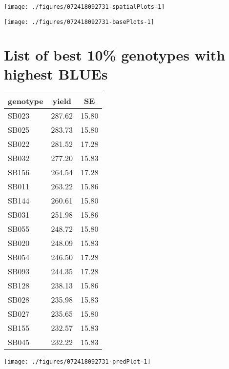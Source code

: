 \documentclass[a4paper,11pt]{article}\usepackage[]{graphicx}\usepackage[]{color}
\newenvironment{knitrout}{}{} %
\begin{document}
\texttt{[image: ./figures/072418092731-spatialPlots-1]} 

\begin{knitrout}
\color{fgcolor}
\texttt{[image: ./figures/072418092731-basePlots-1]} 

\end{knitrout}
\newpage

\section{List of best 10\% genotypes with
highest BLUEs}

\begin{multicols*}{2}
\begin{tabular}{lcc}
  \hline
genotype & yield & SE \\ 
  \hline
SB023 & 287.62 & 15.80 \\ 
  SB025 & 283.73 & 15.80 \\ 
  SB022 & 281.52 & 17.28 \\ 
  SB032 & 277.20 & 15.83 \\ 
  SB156 & 264.54 & 17.28 \\ 
  SB011 & 263.22 & 15.86 \\ 
  SB144 & 260.61 & 15.80 \\ 
  SB031 & 251.98 & 15.86 \\ 
  SB055 & 248.72 & 15.80 \\ 
  SB020 & 248.09 & 15.83 \\ 
  SB054 & 246.50 & 17.28 \\ 
  SB093 & 244.35 & 17.28 \\ 
  SB128 & 238.13 & 15.86 \\ 
  SB028 & 235.98 & 15.83 \\ 
  SB027 & 235.65 & 15.80 \\ 
  SB155 & 232.57 & 15.83 \\ 
  SB045 & 232.22 & 15.83 \\ 
   \hline
\end{tabular}

\columnbreak
\begin{knitrout}
\color{fgcolor}
\texttt{[image: ./figures/072418092731-predPlot-1]} 

\end{knitrout}
\end{multicols*}
\end{document}
